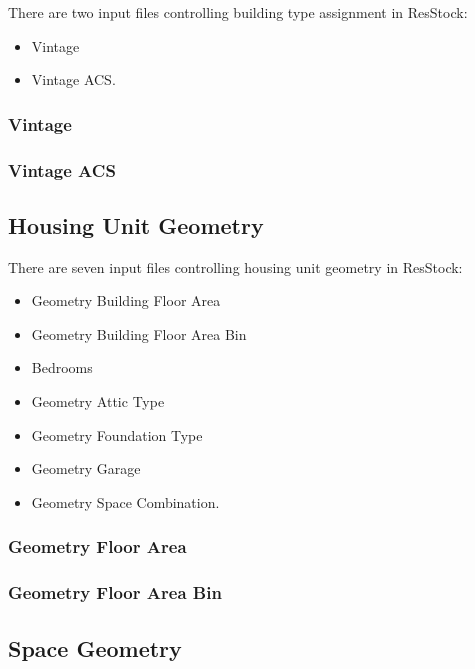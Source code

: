 There are two input files controlling building type assignment in ResStock:

\begin{itemize}
    \item Vintage
    \item Vintage ACS.
\end{itemize}

\subsubsection{Vintage}


\subsubsection{Vintage ACS}


\subsection{Housing Unit Geometry}

There are seven input files controlling housing unit geometry in ResStock:

\begin{itemize}
    \item Geometry Building Floor Area
    \item Geometry Building Floor Area Bin
    \item Bedrooms
    \item Geometry Attic Type
    \item Geometry Foundation Type
    \item Geometry Garage
    \item Geometry Space Combination.
\end{itemize}

\subsubsection{Geometry Floor Area}


\subsubsection{Geometry Floor Area Bin}


\subsection{Space Geometry}
\label{space_geometry}

